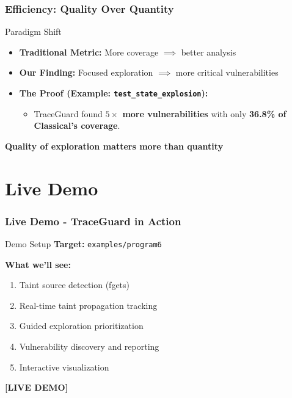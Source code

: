 \documentclass[aspectratio=169]{beamer}
\begin{document}
\begin{frame}
    \frametitle{Efficiency: Quality Over Quantity}
    \begin{evaluation}{Paradigm Shift}
        \begin{itemize}
            \item \textbf{Traditional Metric:} More coverage $\implies$ better analysis
            \item \textbf{Our Finding:} \alert{Focused exploration $\implies$ more critical vulnerabilities}
            \item \textbf{The Proof (Example: \texttt{test\_state\_explosion}):}
                  \begin{itemize}
                        \item TraceGuard found \textbf{$5 \times$ more vulnerabilities} with only \textbf{36.8\% of Classical's coverage}.
                  \end{itemize}
        \end{itemize}
    \end{evaluation}

    \vspace{0.5em}
    \begin{center}
        \large\textbf{\alert{Quality of exploration matters more than quantity}}
    \end{center}
\end{frame}

\section{Live Demo}

\begin{frame}
    \frametitle{Live Demo - TraceGuard in Action}
    \begin{implementation}{Demo Setup}
        \vspace{0.2em}
        \textbf{Target:} \texttt{examples/program6}
        
        \textbf{What we'll see:}
        \begin{enumerate}
            \item Taint source detection (fgets)
            \item Real-time taint propagation tracking
            \item Guided exploration prioritization
            \item Vulnerability discovery and reporting
            \item Interactive visualization
        \end{enumerate}
    \end{implementation}
    
    \begin{center}
        \Large\textbf{[LIVE DEMO]}
    \end{center}
\end{frame}
\end{document}
